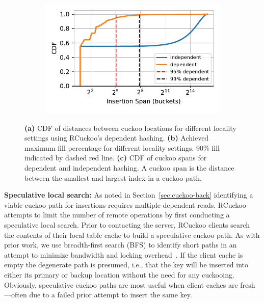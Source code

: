 \begin{figure}[t]
        \begin{subfigure}{0.3\linewidth}
        \includegraphics[width=0.99\linewidth]{fig/insertion_span.pdf}
    \end{subfigure}
    \vspace{-1em}
    \caption{
    \textbf{(a)} CDF of distances between cuckoo locations for different locality settings using RCuckoo's dependent hashing.
    \textbf{(b)} Achieved maximum fill percentage for different locality settings. 90\% fill indicated by dashed red line.
        \textbf{(c)} CDF of cuckoo spans for dependent and independent hashing. A cuckoo span is the distance between the smallest and largest index in a cuckoo path.~
    }
    \label{fig:locality-hashing}

\end{figure}

\textbf{Speculative local search:} As noted in
Section~\ref{sec:cuckoo-back} identifying a viable cuckoo path for
insertions requires multiple dependent reads.  RCuckoo attempts to
limit the number of remote operations by first conducting a
speculative local search. Prior to contacting the server, RCuckoo
clients search the contents of their local table cache to build a
speculative cuckoo path.  As with prior work, we use breadth-first
search (BFS) to identify short paths in an attempt to minimize
bandwidth and locking overhead~\cite{cuckoo-improvements}.  If the
client cache is empty the degenerate path is presumed, i.e., that the
key will be inserted into either its primary or backup location
without the need for any cuckooing.  Obviously, speculative cuckoo
paths are most useful when client caches are fresh---often due to a
failed prior attempt to insert the same key.

